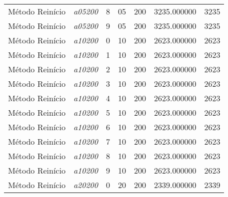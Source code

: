 {\begin{longtable}{cc|c|cc|cc}
			Método Reinício    & \textit{a05200}    & 8                               & 05               & 200              & 3235.000000                          & 3235 \\ 
			Método Reinício    & \textit{a05200}    & 9                               & 05               & 200              & 3235.000000                          & 3235 \\ \hline
			Método Reinício    & \textit{a10200}    & 0                               & 10               & 200              & 2623.000000                          & 2623 \\ 
			Método Reinício    & \textit{a10200}    & 1                               & 10               & 200              & 2623.000000                          & 2623 \\ 
			Método Reinício    & \textit{a10200}    & 2                               & 10               & 200              & 2623.000000                          & 2623 \\ 
			Método Reinício    & \textit{a10200}    & 3                               & 10               & 200              & 2623.000000                          & 2623 \\ 
			Método Reinício    & \textit{a10200}    & 4                               & 10               & 200              & 2623.000000                          & 2623 \\ 
			Método Reinício    & \textit{a10200}    & 5                               & 10               & 200              & 2623.000000                          & 2623 \\ 
			Método Reinício    & \textit{a10200}    & 6                               & 10               & 200              & 2623.000000                          & 2623 \\ 
			Método Reinício    & \textit{a10200}    & 7                               & 10               & 200              & 2623.000000                          & 2623 \\ 
			Método Reinício    & \textit{a10200}    & 8                               & 10               & 200              & 2623.000000                          & 2623 \\ 
			Método Reinício    & \textit{a10200}    & 9                               & 10               & 200              & 2623.000000                          & 2623 \\ \hline
			Método Reinício    & \textit{a20200}    & 0                               & 20               & 200              & 2339.000000                          & 2339 \\ 

\end{longtable}}
